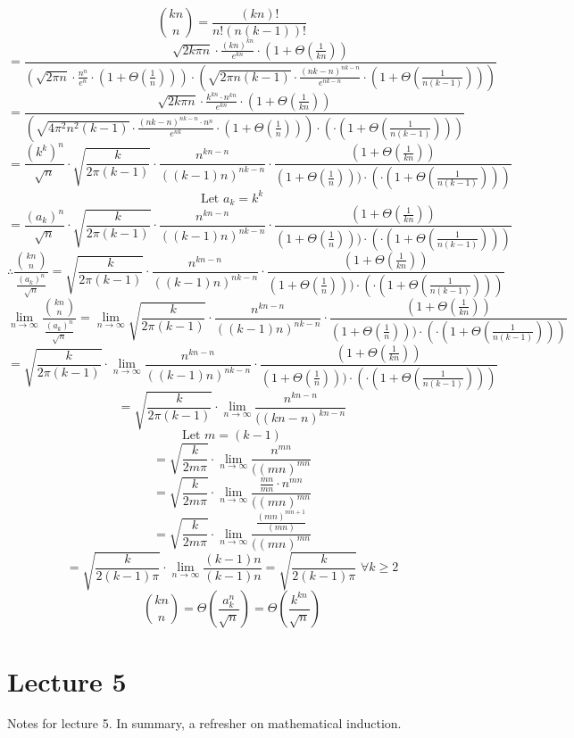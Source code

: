 \documentclass{article}
\begin{document}
$$\binom{kn}{n} = \frac{(kn)!}{n!(n(k-1))!}$$
$$= \frac{\sqrt{2k\pi n} \cdot \frac{(kn)^{kn}}{e^{kn}} \cdot (1 + \Theta(\frac{1}{kn}))}{(\sqrt{2\pi n} \cdot \frac{n^n}{e^n} \cdot (1 + \Theta(\frac{1}{n}))) \cdot (\sqrt{2\pi n(k-1)} \cdot \frac{(nk-n)^{nk-n}}{e^{nk-n}} \cdot (1 + \Theta(\frac{1}{n(k-1)})))}$$
$$= \frac{\sqrt{2k\pi n} \cdot \frac{k^{kn} \cdot n^{kn}}{e^{kn}} \cdot (1 + \Theta(\frac{1}{kn}))}  {(\sqrt{4\pi^2 n^2 (k-1)} \cdot \frac{(nk-n)^{nk-n} \cdot n^n}{e^{nk}} \cdot (1 + \Theta(\frac{1}{n}))) \cdot ( \cdot (1 + \Theta(\frac{1}{n(k-1)})))}$$
$$=\frac{(k^k)^n}{\sqrt{n}} \cdot \sqrt{\frac{k}{2\pi(k-1)}} \cdot \frac{n^{kn - n}}{((k-1)n)^{nk-n}}  \cdot \frac{ (1 + \Theta(\frac{1}{kn}))}{(1 + \Theta(\frac{1}{n}))) \cdot ( \cdot (1 + \Theta(\frac{1}{n(k-1)})))}$$
$$\text{Let } a_{k} = k^k$$
$$=\frac{(a_k)^n}{\sqrt{n}} \cdot \sqrt{\frac{k}{2\pi(k-1)}} \cdot \frac{n^{kn - n}}{((k-1)n)^{nk-n}}  \cdot \frac{ (1 + \Theta(\frac{1}{kn}))}{(1 + \Theta(\frac{1}{n}))) \cdot ( \cdot (1 + \Theta(\frac{1}{n(k-1)})))}$$
$$\therefore \frac{\binom{kn}{n}}{\frac{(a_k)^n}{\sqrt{n}}} = \sqrt{\frac{k}{2\pi(k-1)}} \cdot \frac{n^{kn - n}}{((k-1)n)^{nk-n}}  \cdot \frac{ (1 + \Theta(\frac{1}{kn}))}{(1 + \Theta(\frac{1}{n}))) \cdot ( \cdot (1 + \Theta(\frac{1}{n(k-1)})))}$$
$$\lim_{n \rightarrow \infty} \frac{\binom{kn}{n}}{\frac{(a_k)^n}{\sqrt{n}}} = \lim_{n \rightarrow \infty} \sqrt{\frac{k}{2\pi(k-1)}} \cdot \frac{n^{kn - n}}{((k-1)n)^{nk-n}}  \cdot \frac{ (1 + \Theta(\frac{1}{kn}))}{(1 + \Theta(\frac{1}{n}))) \cdot ( \cdot (1 + \Theta(\frac{1}{n(k-1)})))}$$
$$=\sqrt{\frac{k}{2\pi(k-1)}} \cdot \lim_{n \rightarrow \infty}  \frac{n^{kn - n}}{((k-1)n)^{nk-n}}  \cdot \frac{ (1 + \Theta(\frac{1}{kn}))}{(1 + \Theta(\frac{1}{n}))) \cdot ( \cdot (1 + \Theta(\frac{1}{n(k-1)})))}$$
$$=\sqrt{\frac{k}{2\pi(k-1)}} \cdot \lim_{n \rightarrow \infty}  \frac{n^{kn - n}}{((kn-n)^{kn-n}} $$
$$\text{Let } m = (k-1)$$
$$=\sqrt{\frac{k}{2m\pi}} \cdot \lim_{n \rightarrow \infty}  \frac{n^{mn}}{((mn)^{mn}} $$
$$=\sqrt{\frac{k}{2m\pi}} \cdot \lim_{n \rightarrow \infty}  \frac{\frac{mn}{mn} \cdot n^{mn}}{((mn)^{mn}} $$
$$=\sqrt{\frac{k}{2m\pi}} \cdot \lim_{n \rightarrow \infty}  \frac{\frac{(mn)^{mn+1}}{(mn)}}{((mn)^{mn}} $$
$$=\sqrt{\frac{k}{2(k-1)\pi}} \cdot \lim_{n \rightarrow \infty}  \frac{(k-1)n}{(k-1)n} = \sqrt{\frac{k}{2(k-1)\pi}} \; \forall k \ge 2$$
$$\binom{kn}{n} = \Theta(\frac{a_{k}^{n}}{\sqrt{n}}) = \Theta(\frac{k^{kn}}{\sqrt{n}})$$

\section{Lecture 5}
Notes for lecture 5. In summary, a refresher on mathematical induction.
\end{document}
